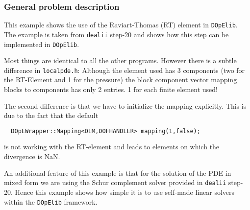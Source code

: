 \subsubsection{General problem description}
This example shows the use of the Raviart-Thomas (RT) element in \texttt{DOpElib}. The example 
is taken from \texttt{dealii} step-20 and shows how this step can be implemented in \texttt{DOpElib}.

Most things are identical to all the other programs. However there is a subtle difference in 
\texttt{localpde.h}: Although the element used has 3 components (two for the RT-Element and 1 for the pressure)
the block\underline{ }component vector mapping blocks to components has only 2 entries. 1 for each finite element used!

The second difference is that we have to initialize the mapping explicitly. This is due to the fact that the 
default 
\begin{verbatim}
  DOpEWrapper::Mapping<DIM,DOFHANDLER> mapping(1,false);
\end{verbatim}
is not working with the RT-element and leads to elements on which the divergence is NaN.

An additional feature of this example is that for the solution of the PDE in mixed form we are using the 
Schur complement solver provided in \texttt{dealii} step-20. Hence this example shows how simple it is to 
use self-made linear solvers within the \texttt{DOpElib} framework.